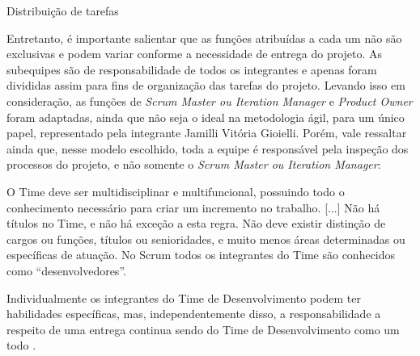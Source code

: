 \begin{quadro}[htb]
\centering
\ABNTEXfontereduzida
\caption{Distribuição de tarefas}
\label{distribuicao_tarefas}
\end{quadro}
\FloatBarrier 

Entretanto, é importante salientar que as funções atribuídas a cada um não são exclusivas e podem variar conforme a necessidade de entrega do projeto. As subequipes são de responsabilidade de todos os integrantes e apenas foram divididas assim para fins de organização das tarefas do projeto. Levando isso em consideração, as funções de \textsl{Scrum Master ou Iteration Manager} e \textsl{Product Owner} foram adaptadas, ainda que não seja o ideal na metodologia ágil, para um único papel, representado pela integrante Jamilli Vitória Gioielli. Porém, vale ressaltar ainda que, nesse modelo escolhido, toda a equipe é responsável pela inspeção dos processos do projeto, e não somente o \textsl{Scrum Master ou Iteration Manager}:

\begin{citacao}
O Time deve ser multidisciplinar e multifuncional, possuindo todo o conhecimento necessário para criar um incremento no trabalho. [...] Não há títulos no Time, e não há exceção a esta regra. Não deve existir distinção de cargos ou funções, títulos ou senioridades, e muito menos áreas determinadas ou específicas de atuação. No Scrum todos os integrantes do Time são conhecidos como “desenvolvedores”.

Individualmente os integrantes do Time de Desenvolvimento podem ter habilidades específicas, mas, independentemente disso, a responsabilidade a respeito de uma entrega continua sendo do Time de Desenvolvimento como um todo \cite{cruz:2018}.
\end{citacao}

